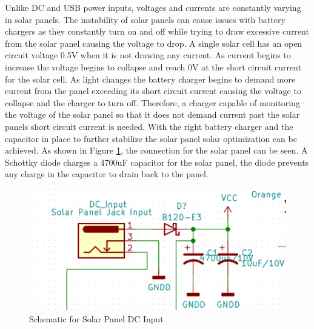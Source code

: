 Unlike DC and USB power inputs, voltages and currents are constantly varying in solar panels. The instability of solar panels can cause issues with battery chargers as they constantly turn on and off while trying to draw excessive current from the solar panel causing the voltage to drop. A single solar cell has an open circuit voltage 0.5V when it is not drawing any current. As current begins to increase the voltage begins to collapse and reach 0V at the short circuit current for the solar cell. As light changes the battery charger begins to demand more current from the panel exceeding its short circuit current causing the voltage to collapse and the charger to turn off. Therefore, a charger capable of monitoring the voltage of the solar panel so that it does not demand current past the solar panels short circuit current is needed. With the right battery charger and the capacitor in place to further stabilize the solar panel solar optimization can be achieved. As shown in Figure \ref{fig:Solar-panel-connection}, the connection for the solar panel can be seen. A Schottky diode charges a 4700uF capacitor for the solar panel, the diode prevents any charge in the capacitor to drain back to the panel.

\begin{figure}
    \centering
    \includegraphics[width=5.5in]{figures/Solar Power Input.png}
    \caption{Schematic for Solar Panel DC Input}
    \label{fig:Solar-panel-connection} 
\end{figure}

